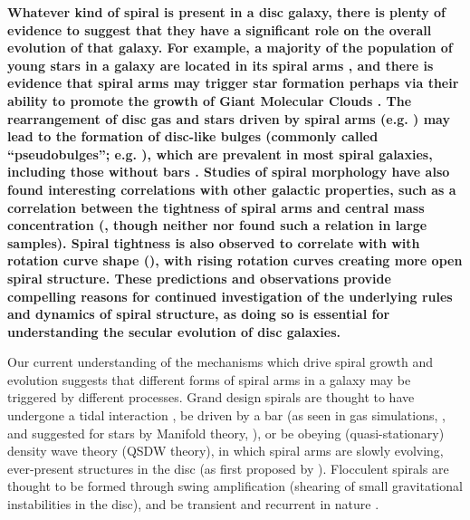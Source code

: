 \textbf{
Whatever kind of spiral is present in a disc galaxy, there is plenty of evidence to suggest that they have a significant role on the overall evolution of that galaxy. For example, a majority of the population of young stars in a galaxy are located in its spiral arms \citep{2011EAS....51...19E}, and there is evidence that spiral arms may trigger star formation \citep{2013A&A...560A..59C} perhaps via their ability to promote the growth of Giant Molecular Clouds \citep{2014IAUS..298..221D}. The rearrangement of disc gas and stars driven by spiral arms (e.g. \citealt{2018MNRAS.476.1561D}) may lead to the formation of disc-like bulges (commonly called ``pseudobulges''; e.g. \citealt{2004ARA&A..42..603K}), which are prevalent in most spiral galaxies, including those without bars \citep{2010ApJ...716..942F}. Studies of spiral morphology have also found interesting correlations with other galactic properties, such as a correlation between the tightness of spiral arms and central mass concentration (\citealt{2019ApJ...871..194Y}, though neither \citealt{2017MNRAS.472.2263H} nor \citealt{2019MNRAS.487.1808M} found such a relation in large samples). Spiral tightness is also observed to correlate with with rotation curve shape (\citealt{2005MNRAS.359.1065S}), with rising rotation curves creating more open spiral structure. These predictions and observations provide compelling reasons for continued investigation of the underlying rules and dynamics of spiral structure, as doing so is essential for understanding the secular evolution of disc galaxies.
}

Our current understanding of the mechanisms which drive spiral growth and evolution suggests that different forms of spiral arms in a galaxy may be triggered by different processes. Grand design spirals are thought to have undergone a tidal interaction \citep{2010MNRAS.403..625D,2017ApJ...834....7S}, be driven by a bar (as seen in gas simulations, \citealt{1976ApJ...209...53S,2008A&A...489..115R}, and suggested for stars by Manifold theory, \citealt{2006A&A...453...39R,2009MNRAS.394...67A,2009MNRAS.400.1706A}), or be obeying (quasi-stationary) density wave theory (QSDW theory), in which spiral arms are slowly evolving, ever-present structures in the disc (as first proposed by \citealt{1964ApJ...140..646L}). Flocculent spirals are thought to be formed through swing amplification (shearing of small gravitational instabilities in the disc), and be transient and recurrent in nature \citep{1966ApJ...146..810J}.

